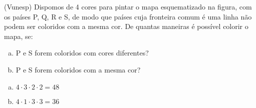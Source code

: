 \begin{ex}
(Vunesp) Dispomos de 4 cores para pintar o mapa esquematizado na figura, com os países P, Q, R e S, de modo que países cuja fronteira comum é uma linha não podem ser coloridos com a mesma cor. De quantas maneiras é possível colorir o mapa, se:
   \begin{enumerate}[(a)]
   \item P e S forem coloridos com cores diferentes?
   \item P e S forem coloridos com a mesma cor?
   \end{enumerate}
\begin{center}
\end{center}
 \begin{sol}
   \phantom{A} 
    \begin{enumerate} [(a)]
        \item $4\cdot3\cdot2\cdot2=48$
        \item $4\cdot1\cdot3\cdot3=36$
    \end{enumerate}
 \end{sol}

\end{ex}
